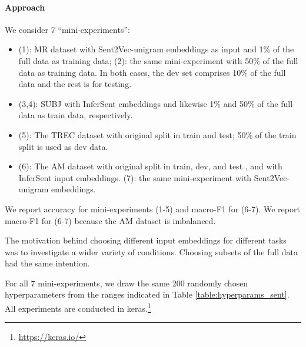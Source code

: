 


\paragraph{Approach}
We consider 7 ``mini-experiments'':
\begin{itemize}[noitemsep,leftmargin=0.6cm]
  \item (1): MR dataset with Sent2Vec-unigram embeddings as input and 1\% of the full data as training data; (2): the same mini-experiment with 50\% of the full data as training data. In both cases, the dev set comprises 10\% of the full data and the rest is for testing. 
  \item (3,4): SUBJ with InferSent embeddings and likewise 1\% and 50\% of the full data as train data, respectively.
  \item (5): The TREC dataset with original split in train and test; 50\% of the train split is used as dev data. 
  \item (6): The AM dataset with original split in train, dev, and test \cite{Eger:2017}, and with InferSent input embeddings. (7): the same mini-experiment with Sent2Vec-unigram embeddings. 
\end{itemize}
We report accuracy for mini-experiments (1-5) and macro-F1 for (6-7). We report macro-F1 for (6-7) because the AM dataset is imbalanced.  

The motivation behind choosing different input embeddings for different tasks was to investigate a wider variety of conditions. 
Choosing subsets of the full data had the same intention. 

For all 7 mini-experiments, we draw the same 200 randomly chosen hyperparameters from the ranges indicated in Table \ref{table:hyperparams_sent}. 
All experiments are conducted in keras.\footnote{\url{https://keras.io/}} %

